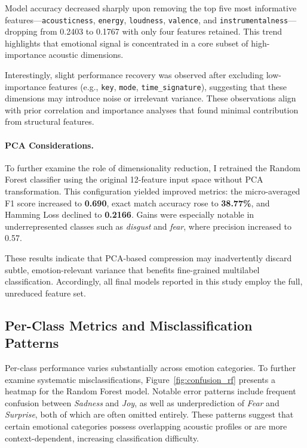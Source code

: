 \documentclass{article}
\begin{document}
Model accuracy decreased sharply upon removing the top five most informative features—\texttt{acousticness}, \texttt{energy}, \texttt{loudness}, \texttt{valence}, and \texttt{instrumentalness}—dropping from 0.2403 to 0.1767 with only four features retained. This trend highlights that emotional signal is concentrated in a core subset of high-importance acoustic dimensions.

Interestingly, slight performance recovery was observed after excluding low-importance features (e.g., \texttt{key}, \texttt{mode}, \texttt{time\_signature}), suggesting that these dimensions may introduce noise or irrelevant variance. These observations align with prior correlation and importance analyses that found minimal contribution from structural features.

\paragraph{PCA Considerations.} To further examine the role of dimensionality reduction, I retrained the Random Forest classifier using the original 12-feature input space without PCA transformation. This configuration yielded improved metrics: the micro-averaged F1 score increased to \textbf{0.690}, exact match accuracy rose to \textbf{38.77\%}, and Hamming Loss declined to \textbf{0.2166}. Gains were especially notable in underrepresented classes such as \textit{disgust} and \textit{fear}, where precision increased to 0.57.

These results indicate that PCA-based compression may inadvertently discard subtle, emotion-relevant variance that benefits fine-grained multilabel classification. Accordingly, all final models reported in this study employ the full, unreduced feature set.

\subsection{Per-Class Metrics and Misclassification Patterns}

Per-class performance varies substantially across emotion categories. To further examine systematic misclassifications, Figure~\ref{fig:confusion_rf} presents a heatmap for the Random Forest model. Notable error patterns include frequent confusion between \textit{Sadness} and \textit{Joy}, as well as underprediction of \textit{Fear} and \textit{Surprise}, both of which are often omitted entirely. These patterns suggest that certain emotional categories possess overlapping acoustic profiles or are more context-dependent, increasing classification difficulty.
\end{document}
